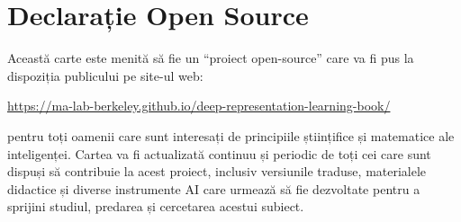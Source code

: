 \documentclass[../../book-main_ro.tex]{subfiles}
\begin{document}
\chapter*{Declarație Open Source}

Această carte este menită să fie un ``proiect open-source'' care va fi pus la dispoziția publicului pe site-ul web:
\begin{center}
    \url{https://ma-lab-berkeley.github.io/deep-representation-learning-book/}
\end{center}
pentru toți oamenii care sunt interesați de principiile științifice și matematice ale inteligenței. Cartea va fi actualizată continuu și periodic de toți cei care sunt dispuși să contribuie la acest proiect, inclusiv versiunile traduse, materialele didactice și diverse instrumente AI care urmează să fie dezvoltate pentru a sprijini studiul, predarea și cercetarea acestui subiect.
\end{document}
